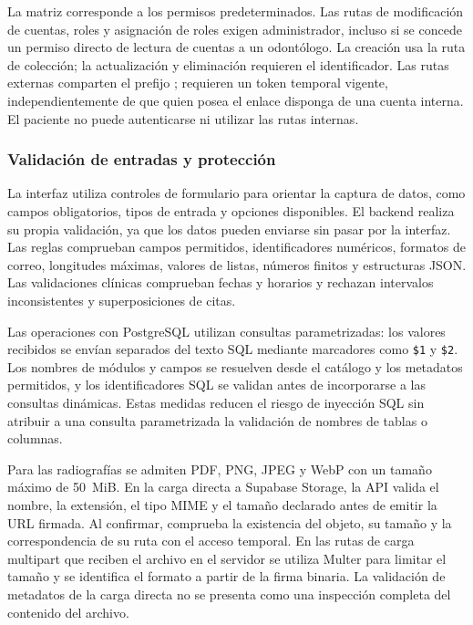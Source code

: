 La matriz corresponde a los permisos predeterminados. Las rutas de modificación
de cuentas, roles y asignación de roles exigen administrador, incluso si se
concede un permiso directo de lectura de cuentas a un odontólogo. La creación
usa la ruta de colección; la actualización y eliminación requieren el
identificador. Las rutas externas comparten el prefijo
; requieren un token temporal vigente,
independientemente de que quien posea el enlace disponga de una cuenta interna.
El paciente no puede autenticarse ni utilizar las rutas internas.

\subsubsection{Validación de entradas y protección}

La interfaz utiliza controles de formulario para orientar la captura de
datos, como campos obligatorios, tipos de entrada y opciones disponibles.
El backend realiza su propia validación, ya que los datos pueden enviarse
sin pasar por la interfaz. Las reglas comprueban campos permitidos,
identificadores numéricos, formatos de correo, longitudes máximas,
valores de listas, números finitos y estructuras JSON. Las validaciones
clínicas comprueban fechas y horarios y rechazan intervalos inconsistentes
y superposiciones de citas.

Las operaciones con PostgreSQL utilizan consultas parametrizadas: los
valores recibidos se envían separados del texto SQL mediante marcadores
como \texttt{\$1} y \texttt{\$2}. Los nombres de módulos y campos se
resuelven desde el catálogo y los metadatos permitidos, y los identificadores
SQL se validan antes de incorporarse a las consultas dinámicas. Estas
medidas reducen el riesgo de inyección SQL sin atribuir a una consulta
parametrizada la validación de nombres de tablas o columnas.

Para las radiografías se admiten PDF, PNG, JPEG y WebP con un tamaño máximo
de \mbox{50 MiB}. En la carga directa a Supabase Storage, la API valida el
nombre, la extensión, el tipo MIME y el tamaño declarado antes de emitir
la URL firmada. Al confirmar, comprueba la existencia del objeto, su tamaño
y la correspondencia de su ruta con el acceso temporal. En las rutas de
carga multipart que reciben el archivo en el servidor se utiliza Multer
para limitar el tamaño y se identifica el formato a partir de la firma
binaria. La validación de metadatos de la carga directa no se presenta como
una inspección completa del contenido del archivo.

